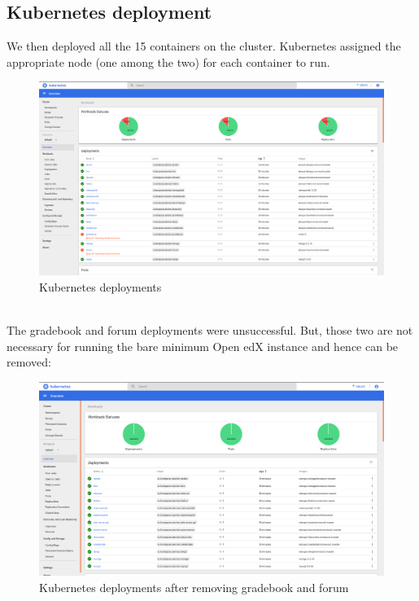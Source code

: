 \documentclass[12pt]{report}
\begin{document}
\subsection{Kubernetes deployment}
We then deployed all the 15 containers on the cluster. Kubernetes assigned the appropriate node (one among the two) for each container to run.
\begin{figure}[h!]
	\begin{center}
		\includegraphics[totalheight=0.34\textheight]{fgcrash}
		\caption{Kubernetes deployments}
	\end{center}
\end{figure}
\\The gradebook and forum deployments were unsuccessful. But, those two are not necessary for running the bare minimum Open edX instance and hence can be removed:
\begin{figure}[h!]
	\begin{center}
		\includegraphics[totalheight=0.34\textheight]{dep100}
		\caption{Kubernetes deployments after removing gradebook and forum}
	\end{center}
\end{figure}
\end{document}
